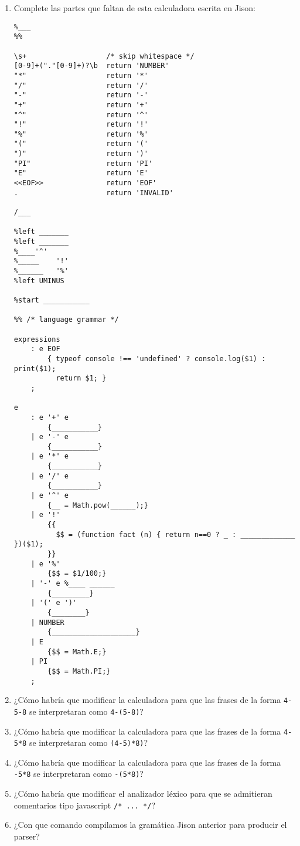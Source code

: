 \item 
\begin{enumerate}
\item 
Complete las partes que faltan de esta calculadora escrita en Jison:
\begin{verbatim}
%___
%%

\s+                   /* skip whitespace */
[0-9]+("."[0-9]+)?\b  return 'NUMBER'
"*"                   return '*'
"/"                   return '/'
"-"                   return '-'
"+"                   return '+'
"^"                   return '^'
"!"                   return '!'
"%"                   return '%'
"("                   return '('
")"                   return ')'
"PI"                  return 'PI'
"E"                   return 'E'
<<EOF>>               return 'EOF'
.                     return 'INVALID'

/___

%left _______
%left _______
%____'^'
%_____    '!'
%______   '%'
%left UMINUS

%start ___________

%% /* language grammar */

expressions
    : e EOF
        { typeof console !== 'undefined' ? console.log($1) : print($1);
          return $1; }
    ;

e
    : e '+' e
        {___________}
    | e '-' e
        {___________}
    | e '*' e
        {___________}
    | e '/' e
        {___________}
    | e '^' e
        {__ = Math.pow(______);}
    | e '!'
        {{
          $$ = (function fact (n) { return n==0 ? _ : _____________ })($1);
        }}
    | e '%'
        {$$ = $1/100;}
    | '-' e %____ ______
        {_________}
    | '(' e ')'
        {________}
    | NUMBER
        {____________________}
    | E
        {$$ = Math.E;}
    | PI
        {$$ = Math.PI;}
    ;
\end{verbatim}
\item 
¿Cómo  habría que modificar la calculadora  para que las frases de
la forma \verb|4-5-8| se interpretaran como \verb|4-(5-8)|?
\item 
¿Cómo  habría que modificar la calculadora  para que las frases de
la forma \verb|4-5*8| se interpretaran como \verb|(4-5)*8)|?
\item 
¿Cómo  habría que modificar la calculadora  para que las frases de
la forma \verb|-5*8| se interpretaran como \verb|-(5*8)|?
\item 
¿Cómo habría que modificar el analizador léxico para que se admitieran 
comentarios tipo javascript \verb|/* ... */|?
\item 
¿Con que comando compilamos la gramática Jison anterior para producir el parser?
\end{enumerate}
